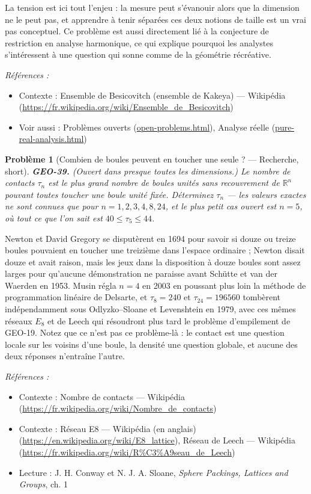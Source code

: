 \documentclass[11pt]{article}
\newtheorem{problem}{Problème}
\newenvironment{refs}{\par\small\noindent\emph{Références :}\begin{itemize}\setlength\itemsep{0pt}}{\end{itemize}\normalsize}
\begin{document}
\noindent La tension est ici tout l'enjeu : la mesure peut s'évanouir alors que la dimension ne le peut pas, et apprendre à tenir séparées ces deux notions de taille est un vrai pas conceptuel. Ce problème est aussi directement lié à la conjecture de restriction en analyse harmonique, ce qui explique pourquoi les analystes s'intéressent à une question qui sonne comme de la géométrie récréative.

\begin{refs}
\item Contexte : Ensemble de Besicovitch (ensemble de Kakeya) --- Wikipédia (\url{https://fr.wikipedia.org/wiki/Ensemble_de_Besicovitch})
\item Voir aussi : Problèmes ouverts (\url{open-problems.html}), Analyse réelle (\url{pure-real-analysis.html})
\end{refs}

\bigskip

\begin{problem}[{Combien de boules peuvent en toucher une seule ? --- Recherche, short}]
\textbf{GEO-39.} (Ouvert dans presque toutes les dimensions.) Le nombre de
contacts $ \tau_n $ est le plus grand nombre de boules unités sans recouvrement de
$ \mathbb{R}^n $ pouvant toutes toucher une boule unité fixée. Déterminez $ \tau_n $ --- les
valeurs exactes ne sont connues que pour $ n = 1, 2, 3, 4, 8, 24 $, et le plus petit cas ouvert
est $ n = 5 $, où tout ce que l'on sait est $ 40 \le \tau_5 \le 44 $.
\end{problem}

\noindent Newton et David Gregory se disputèrent en 1694 pour savoir si douze ou treize
boules pouvaient en toucher une treizième dans l'espace ordinaire ; Newton disait douze et avait
raison, mais les jeux dans la disposition à douze boules sont assez larges pour qu'aucune
démonstration ne paraisse avant Schütte et van der Waerden en 1953. Musin régla $ n = 4 $ en 2003
en poussant plus loin la méthode de programmation linéaire de Delsarte, et $ \tau_8 = 240 $ et
$ \tau_{24} = 196560 $ tombèrent indépendamment sous Odlyzko--Sloane et Levenshtein en 1979, avec
ces mêmes réseaux $ E_8 $ et de Leech qui résoudront plus tard le problème d'empilement de
GEO-19. Notez que ce n'est pas ce problème-là : le contact est une question locale sur les voisins
d'une boule, la densité une question globale, et aucune des deux réponses n'entraîne l'autre.

\begin{refs}
\item Contexte : Nombre de contacts --- Wikipédia (\url{https://fr.wikipedia.org/wiki/Nombre_de_contacts})
\item Contexte : Réseau E8 --- Wikipédia (en anglais) (\url{https://en.wikipedia.org/wiki/E8_lattice}), Réseau de Leech --- Wikipédia (\url{https://fr.wikipedia.org/wiki/R%C3%A9seau_de_Leech})
\item Lecture : J. H. Conway et N. J. A. Sloane, \textit{Sphere Packings, Lattices and Groups}, ch. 1
\end{refs}
\end{document}
